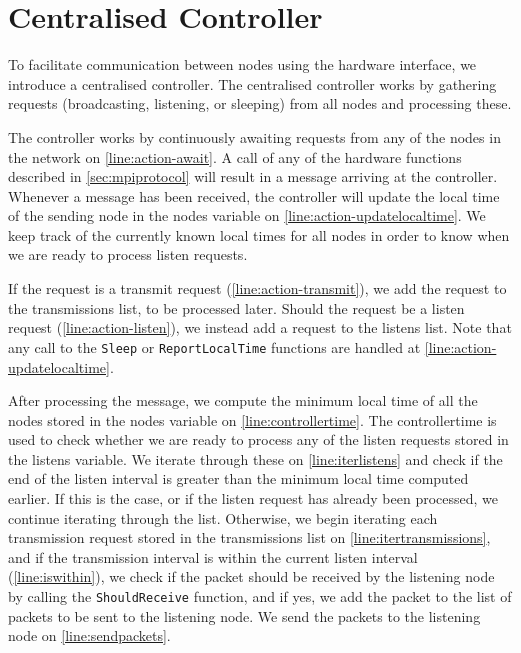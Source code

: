 \section{Centralised Controller}\label{sec:mpicontroller}

To facilitate communication between nodes using the hardware interface, we introduce a centralised controller. The centralised controller works by gathering requests (broadcasting, listening, or sleeping) from all nodes and processing these.\medbreak

The controller works by continuously awaiting requests from any of the nodes in the network on \autoref{line:action-await}. A call of any of the hardware functions described in \autoref{sec:mpiprotocol} will result in a message arriving at the controller. Whenever a message has been received, the controller will update the local time of the sending node in the nodes variable on \autoref{line:action-updatelocaltime}. We keep track of the currently known local times for all nodes in order to know when we are ready to process listen requests. \smallbreak

If the request is a transmit request (\autoref{line:action-transmit}), we add the request to the transmissions list, to be processed later. Should the request be a listen request (\autoref{line:action-listen}), we instead add a request to the listens list. Note that any call to the \texttt{Sleep} or \texttt{ReportLocalTime} functions are handled at \autoref{line:action-updatelocaltime}.\smallbreak

After processing the message, we compute the minimum local time of all the nodes stored in the nodes variable on \autoref{line:controllertime}. The controllertime is used to check whether we are ready to process any of the listen requests stored in the listens variable. We iterate through these on \autoref{line:iterlistens} and check if the end of the listen interval is greater than the minimum local time computed earlier. If this is the case, or if the listen request has already been processed, we continue iterating through the list. Otherwise, we begin iterating each transmission request stored in the transmissions list on \autoref{line:itertransmissions}, and if the transmission interval is within the current listen interval (\autoref{line:iswithin}), we check if the packet should be received by the listening node by calling the \texttt{ShouldReceive} function, and if yes, we add the packet to the list of packets to be sent to the listening node. We send the packets to the listening node on \autoref{line:sendpackets}.\medbreak


